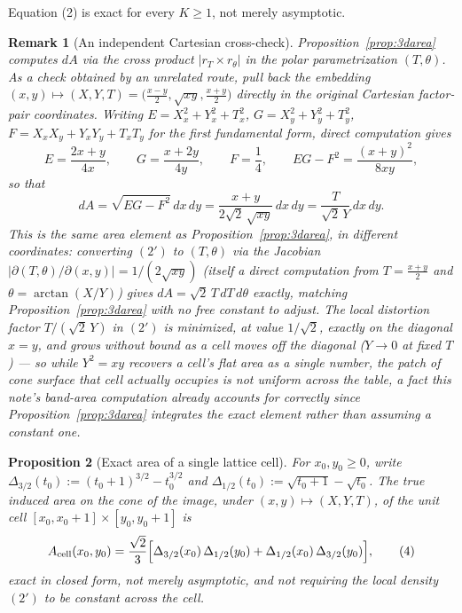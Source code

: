 \documentclass[11pt]{amsart}
\newtheorem{proposition}{Proposition}
\newtheorem{remark}[proposition]{Remark}
\theoremstyle{remark}
\begin{document}
Equation (2) is exact for every $K\ge1$, not merely asymptotic.

\begin{remark}[An independent Cartesian cross-check]\label{rem:cartesian}
Proposition~\ref{prop:3darea} computes $dA$ via the cross product $|r_T\times r_\theta|$ in the polar parametrization $(T,\theta)$. As a check obtained by an unrelated route, pull back the embedding $(x,y)\mapsto(X,Y,T)=\big(\tfrac{x-y}2,\sqrt{xy},\tfrac{x+y}2\big)$ directly in the original Cartesian factor-pair coordinates. Writing $E=X_x^2+Y_x^2+T_x^2$, $G=X_y^2+Y_y^2+T_y^2$, $F=X_xX_y+Y_xY_y+T_xT_y$ for the first fundamental form, direct computation gives
\[
E=\frac{2x+y}{4x},\qquad G=\frac{x+2y}{4y},\qquad F=\frac14,\qquad
EG-F^2=\frac{(x+y)^2}{8xy},
\]
so that
\begin{equation}
dA=\sqrt{EG-F^2}\,dx\,dy=\frac{x+y}{2\sqrt2\,\sqrt{xy}}\,dx\,dy=\frac{T}{\sqrt2\,Y}\,dx\,dy. \tag{2$'$}
\end{equation}
This is the same area element as Proposition~\ref{prop:3darea}, in different coordinates: converting $(2')$ to $(T,\theta)$ via the Jacobian $\big|\partial(T,\theta)/\partial(x,y)\big|=1/(2\sqrt{xy})$ (itself a direct computation from $T=\tfrac{x+y}2$ and $\theta=\arctan(X/Y)$) gives $dA=\sqrt2\,T\,dT\,d\theta$ exactly, matching Proposition~\ref{prop:3darea} with no free constant to adjust. The local distortion factor $T/(\sqrt2\,Y)$ in $(2')$ is minimized, at value $1/\sqrt2$, exactly on the diagonal $x=y$, and grows without bound as a cell moves off the diagonal ($Y\to0$ at fixed $T$) --- so while $Y^2=xy$ recovers a cell's flat area as a single number, the patch of cone surface that cell actually occupies is not uniform across the table, a fact this note's band-area computation already accounts for correctly since Proposition~\ref{prop:3darea} integrates the exact element rather than assuming a constant one.
\end{remark}

\begin{proposition}[Exact area of a single lattice cell]\label{prop:cellarea}
For $x_0,y_0\ge0$, write $\Delta_{3/2}(t_0):=(t_0+1)^{3/2}-t_0^{3/2}$ and $\Delta_{1/2}(t_0):=\sqrt{t_0+1}-\sqrt{t_0}$. The true induced area on the cone of the image, under $(x,y)\mapsto(X,Y,T)$, of the unit cell $[x_0,x_0+1]\times[y_0,y_0+1]$ is
\begin{equation}
A_{\rm cell}(x_0,y_0)=\frac{\sqrt2}3\Big[\Delta_{3/2}(x_0)\,\Delta_{1/2}(y_0)+\Delta_{1/2}(x_0)\,\Delta_{3/2}(y_0)\Big], \tag{4}
\end{equation}
exact in closed form, not merely asymptotic, and not requiring the local density $(2')$ to be constant across the cell.
\end{proposition}
\end{document}
